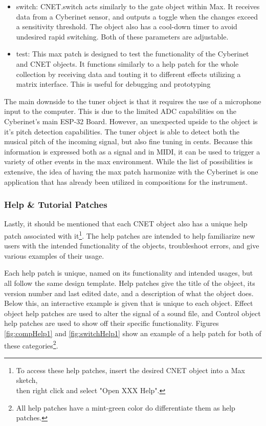 \begin{itemize}
    \item switch: CNET.switch acts similarly to the gate object within Max. It receives data from a Cyberinet sensor, and outputs a toggle when the changes exceed a sensitivity threshold. The object also has a cool-down timer to avoid undesired rapid switching. Both of these parameters are adjustable.
    \item test: This max patch is designed to test the functionality of the Cyberinet and CNET objects. It functions similarly to a help patch for the whole collection by receiving data and touting it to different effects utilizing a matrix interface. This is useful for debugging and prototyping
\end{itemize}


The main downside to the tuner object is that it requires the use of a microphone input to the computer. This is due to the limited ADC capabilities on the Cyberinet's main ESP-32 Board. However, an unexpected upside to the object is it's pitch detection capabilities. The tuner object is able to detect both the musical pitch of the incoming signal, but also fine tuning in cents. Because this information is expressed both as a signal and in MIDI, it can be used to trigger a variety of other events in the max environment. While the list of possibilities is extensive, the idea of having the max patch harmonize with the Cyberinet is one application that has already been utilized in compositions for the instrument.

\subsubsection{Help \& Tutorial Patches}

Lastly, it should be mentioned that each CNET object also has a unique help patch associated with it\footnote{To access these help patches, insert the desired CNET object into a Max sketch, \\ then right click and select "Open XXX Help".}. The help patches are intended to help familiarize new users with the intended functionality of the objects, troubleshoot errors, and give various examples of their usage.

Each help patch is unique, named on its functionality and intended usages, but all follow the same design template. Help patches give the title of the object, its version number and last edited date, and a description of what the object does. Below this, an interactive example is given that is unique to each object. Effect object help patches are used to alter the signal of a sound file, and Control object help patches are used to show off their specific functionality. Figures \ref{fig:compHelp1} and \ref{fig:switchHelp1} show an example of a help patch for both of these categories\footnote{All help patches have a mint-green color do differentiate them as help patches.}.

